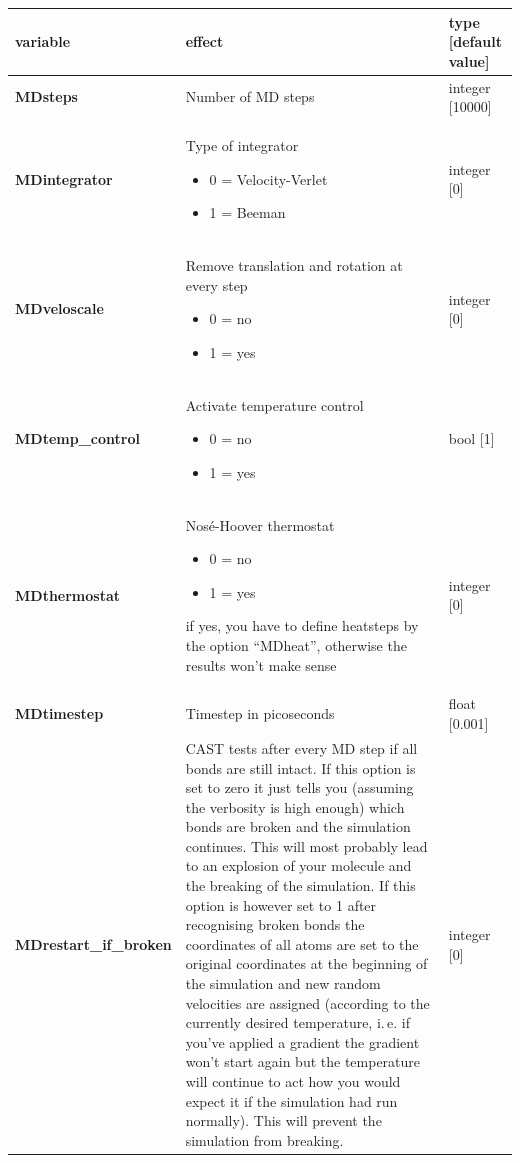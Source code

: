 \documentclass[10pt,a4paper]{article} %
\begin{document}
	\begin{longtable}{|p{3.5cm}|p{5cm}|p{3cm}|}
		variable & effect & type [default value] \\
		\hline
		\textbf{MDsteps} & Number of MD steps & integer [10000] \\
		\textbf{MDintegrator} & Type of integrator \begin{itemize}
			\item 0  = Velocity-Verlet \item 1 = Beeman
			\end{itemize} 	
		& integer [0] \\
		\textbf{MDveloscale} & Remove translation and rotation at every step\begin{itemize} \item 0 = no \item 1 = yes\end{itemize}& integer [0] \\
		\textbf{MDtemp\_control} & Activate temperature control\begin{itemize} \item 0 = no \item 1 = yes\end{itemize}& bool [1] \\
		\textbf{MDthermostat} & Nosé-Hoover thermostat\begin{itemize} \item 0 = no \item 1 = yes\end{itemize} if yes, you have to define heatsteps by the option ``MDheat'', otherwise the results won't make sense
		 & integer [0] \\
		\textbf{MDtimestep} & Timestep in picoseconds & float [0.001] \\
		\textbf{MDrestart\_if\_broken} & CAST tests after every MD step if all bonds are still intact. If this option is set to zero it just tells you (assuming the verbosity is high enough) which bonds are broken and the simulation continues. This will most probably lead to an explosion of your molecule and the breaking of the simulation. If this option is however set to 1 after recognising broken bonds the coordinates of all atoms are set to the original coordinates at the beginning of the simulation and new random velocities are assigned (according to the currently desired temperature, i.\,e. if you've applied a gradient the gradient won't start again but the temperature will continue to act how you would expect it if the simulation had run normally). This will prevent the simulation from breaking. & integer [0] \\

\end{longtable}
\end{document}
